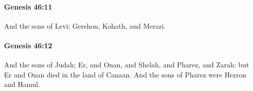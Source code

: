 		\paragraph{Genesis 46:11} %
			\label{GENESIS-46-11}

			And the sons of Levi; Gershon, Kohath, and Merari.


		\paragraph{Genesis 46:12} %
			\label{GENESIS-46-12}

			And the sons of Judah; Er, and Onan, and Shelah, and Pharez, and Zarah: but Er and Onan died in the land of Canaan. And the sons of Pharez were Hezron and Hamul.


